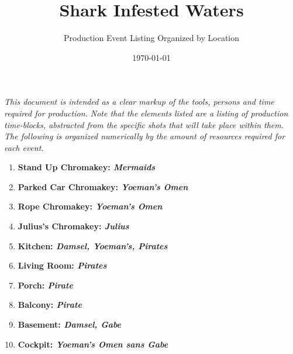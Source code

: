 \documentclass[12pt,A1]{article}
\author{Production Event Listing Organized by Location}
\title{Shark Infested Waters}
\date{\today}
\begin{document}
\maketitle

\textit{This document is intended as a clear markup of the tools, persons and time required for production. Note that the elements listed are a listing of production time-blocks, abstracted from the specific shots that will take place within them. The following is organized numerically by the amount of resources required for each event. }

\begin{enumerate}

\item \textbf{Stand Up Chromakey: \textit{Mermaids}} \newline
\textit{} \newline

\item \textbf{Parked Car Chromakey: \textit{Yoeman's Omen}} \newline
\textit{} \newline

\item \textbf{Rope Chromakey: \textit{Yoeman's Omen}} \newline
\textit{} \newline


\item \textbf{Julius's Chromakey: \textit{Julius}} \newline
\textit{} \newline


\item \textbf{Kitchen: \textit{Damsel, Yoeman's, Pirates}} \newline
\textit{} \newline


\item \textbf{Living Room: \textit{Pirates}} \newline
\textit{} \newline


\item \textbf{Porch: \textit{Pirate}} \newline
\textit{} \newline


\item \textbf{Balcony: \textit{Pirate}} \newline
\textit{} \newline


\item \textbf{Basement: \textit{Damsel, Gabe}} \newline
\textit{} \newline


\item \textbf{Cockpit: \textit{Yoeman's Omen sans Gabe}} \newline
\textit{} \newline
    


\end{enumerate}
\end{document}
